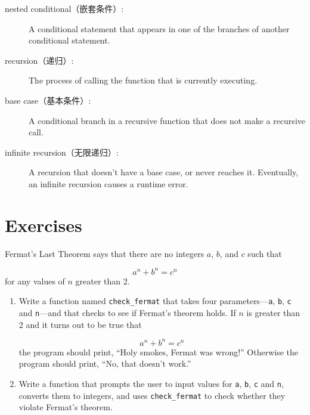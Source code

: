 \documentclass[10pt]{book}
\begin{document}
\begin{CJK}{UTF8}{gbsn}
\begin{description}
\item[nested conditional（嵌套条件）:]  A conditional statement that appears
in one of the branches of another conditional statement.

\item[recursion（递归）:]  The process of calling the function that is
currently executing.

\item[base case（基本条件）:]  A conditional branch in a
recursive function that does not make a recursive call.

\item[infinite recursion（无限递归）:]  A recursion that doesn't have a
base case, or never reaches it.  Eventually, an infinite recursion
causes a runtime error.

\end{description}

\section{Exercises}

\begin{exercise}

Fermat's Last Theorem says that there are no integers
$a$, $b$, and $c$ such that

\[ a^n + b^n = c^n \]
%
for any values of $n$ greater than 2.

\begin{enumerate}

\item Write a function named \verb"check_fermat" that takes four
parameters---{\tt a}, {\tt b}, {\tt c} and {\tt n}---and
that checks to see if Fermat's theorem holds.  If
$n$ is greater than 2 and it turns out to be true that 

\[a^n + b^n = c^n \]
%
the program should print, ``Holy smokes, Fermat was wrong!''
Otherwise the program should print, ``No, that doesn't work.''

\item Write a function that prompts the user to input values
for {\tt a}, {\tt b}, {\tt c} and {\tt n}, converts them to
integers, and uses \verb"check_fermat" to check whether they
violate Fermat's theorem.

\end{enumerate}

\end{exercise}



\end{CJK}
\end{document}
